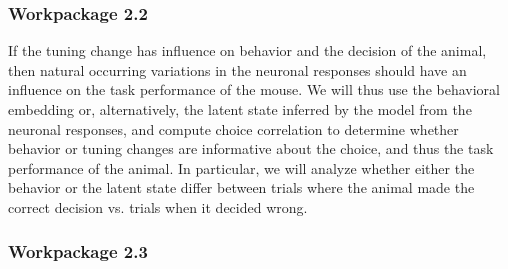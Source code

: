 \documentclass[B2,COG]{ercgrant}
\begin{document}
\subsubsection{Workpackage 2.2\hfill {}}
If the tuning change has influence on behavior and the decision of the animal, then natural occurring variations in the neuronal responses should have an influence on the task performance of the mouse. 
We will thus use the behavioral embedding or, alternatively, the latent state inferred by the model from the neuronal responses, and compute choice correlation to determine whether behavior or tuning changes are informative about the choice, and thus the task performance of the animal. 
In particular, we will analyze whether either the behavior or the latent state differ between trials where the animal made the correct decision vs. trials when it decided wrong. 


\subsubsection{Workpackage 2.3\hfill {}}
\end{document}
